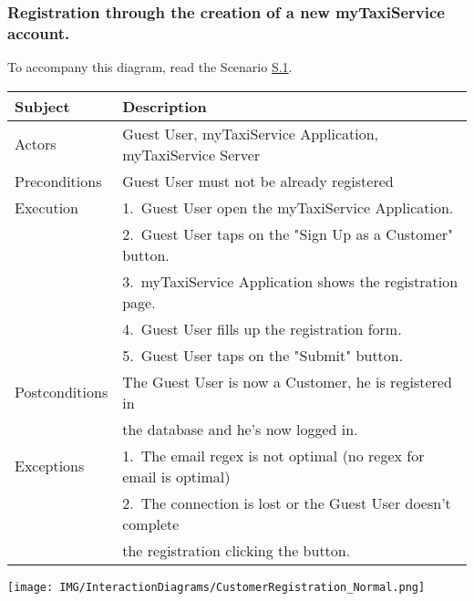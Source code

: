 \subsubsection{Registration through the creation of a new myTaxiService account.}
			To accompany this diagram, read the Scenario \hyperref[sec:NormalCustomerRegistrationScenario]{S.1}.

				\begin{table}[htpb]
					\centering
					\label{tab:NormalCustomerRegistrationDiagramTable}
					\begin{tabularx}{\textwidth}{ll}
						\hline
						\hline
							\textbf{Subject}
						& 
							\textbf{Description}\\
						\hline
							Actors	       &  Guest User, myTaxiService Application, myTaxiService Server\\
						\hline
							Preconditions  &  Guest User must not be already registered\\
						\hline
							Execution      &  1.~Guest User open the myTaxiService Application.\\
										   &  2.~Guest User taps on the "Sign Up as a Customer" button.\\
										   &  3.~myTaxiService Application shows the registration page.\\
										   &  4.~Guest User fills up the registration form.\\
										   &  5.~Guest User taps on the "Submit" button.\\
						\hline
							Postconditions &  The Guest User is now a Customer, he is registered in \\ 
										   &  the database and he's now logged in.\\
						\hline
							Exceptions     &  1.~The email regex is not optimal (no regex for email is optimal)\\
										   &  2.~The connection is lost or the Guest User doesn't complete\\ 
										   &     the registration clicking the button.\\
									
						\hline
						\hline
					\end{tabularx}
				\end{table}
				\begin{center}
					\texttt{[image: IMG/InteractionDiagrams/CustomerRegistration\_Normal.png]}
				\end{center}